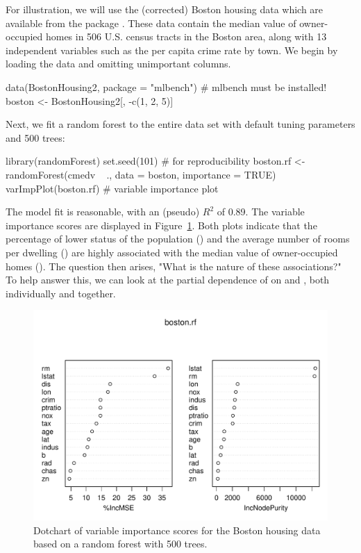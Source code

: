 For illustration, we will use the (corrected) Boston housing data which are available from the  package \citep{mlbench-pkg}. These data contain the median value of owner-occupied homes in 506 U.S. census tracts in the Boston area, along with 13 independent variables such as the per capita crime rate by town. We begin by loading the data and omitting unimportant columns.
\begin{example}
data(BostonHousing2, package = "mlbench")  # mlbench must be installed!
boston <- BostonHousing2[, -c(1, 2, 5)]
\end{example}
Next, we fit a random forest to the entire data set with default tuning parameters and 500 trees:
\begin{example}
library(randomForest)
set.seed(101)  # for reproducibility
boston.rf <- randomForest(cmedv ~ ., data = boston, importance = TRUE)
varImpPlot(boston.rf)  # variable importance plot
\end{example}
The model fit is reasonable, with an  (pseudo) $R^2$ of 0.89. The variable importance scores are displayed in Figure~\ref{fig:plotmo_vs_partial}. Both plots indicate that the percentage of lower status of the population () and the average number of rooms per dwelling () are highly associated with the median value of owner-occupied homes (). The question then arises, "What is the nature of these associations?" To help answer this, we can look at the partial dependence of  on  and , both individually and together.

\begin{figure}[htbp]
  \centering
  \includegraphics[width=1.0\linewidth]{boston_rf_vimp}
  \caption{Dotchart of variable importance scores for the Boston housing data based on a random forest with 500 trees.}
  \label{fig:plotmo_vs_partial}
\end{figure}


